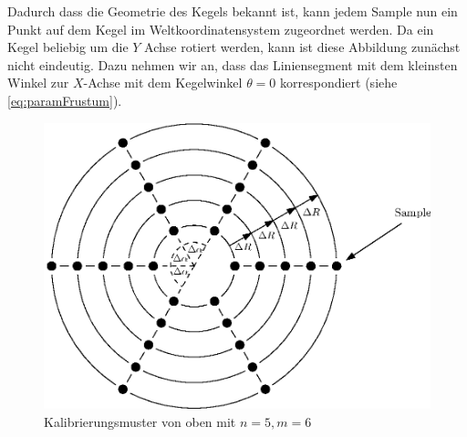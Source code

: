 Dadurch dass die Geometrie des Kegels bekannt ist, kann jedem Sample nun ein Punkt auf dem Kegel im Weltkoordinatensystem zugeordnet werden. Da ein Kegel beliebig um die $Y$ Achse rotiert werden, kann ist diese Abbildung zunächst nicht eindeutig. Dazu nehmen wir an, dass das Liniensegment mit dem kleinsten Winkel zur $X$-Achse mit dem Kegelwinkel $\theta = 0$ korrespondiert (siehe \ref{eq:paramFrustum}).

\begin{figure}[!htb]
	\centering
	\includegraphics[scale=.8]{images/calibrationPatternTop.eps}
	\caption{Kalibrierungsmuster von oben mit $n = 5, m = 6$}
	\label{fig:calibrationPatternTop}
\end{figure}


